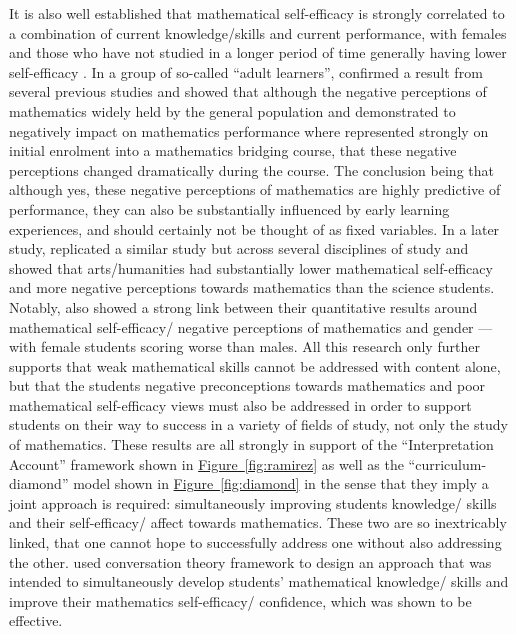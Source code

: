 \documentclass[twoside,12pt,a4paper]{report}
\newcommand{\reffig}[1]{\hyperref[fig:#1]{Figure~\ref{fig:#1}}}
\begin{document}
 It is also well established that mathematical self-efficacy is strongly correlated to a combination of current knowledge/skills and current performance, with females and those who have not studied in a longer period of time generally having lower self-efficacy \cite{Carmichael2006, Carmichael2005}. In a group of so-called ``adult learners'',  confirmed a result from several previous studies and showed that although the negative perceptions of mathematics widely held by the general population and demonstrated to negatively impact on mathematics performance where represented strongly on initial enrolment into a mathematics bridging course, that these negative perceptions changed dramatically during the course. The conclusion being that although yes, these negative perceptions of mathematics are highly predictive of performance, they can also be substantially influenced by early learning experiences, and should certainly not be thought of as fixed variables. In a later study,  replicated a similar study but across several disciplines of study and showed that arts/humanities had substantially lower mathematical self-efficacy and more negative perceptions towards mathematics than the science students. Notably,   also showed a strong link between their quantitative results around mathematical self-efficacy/ negative perceptions of mathematics and gender --- with female students scoring worse than males. All this research only further supports that weak mathematical skills cannot be addressed with content alone, but that the students negative preconceptions towards mathematics and poor mathematical self-efficacy views must also be addressed in order to support students on their way to success in a variety of fields of study, not only the study of mathematics. These results are all strongly in support of the  ``Interpretation Account'' framework shown in \reffig{ramirez} as well as the ``curriculum-diamond'' model shown in \reffig{diamond} in the sense that they imply a joint approach is required: simultaneously improving students knowledge/ skills and their self-efficacy/ affect towards mathematics. These two are so inextricably linked, that one cannot hope to successfully address one without also addressing the other. \cite{Taylor2006} used conversation theory framework to design an approach that was intended to simultaneously develop students' mathematical knowledge/ skills  and improve their mathematics self-efficacy/ confidence, which was shown to be effective. 
\end{document}
